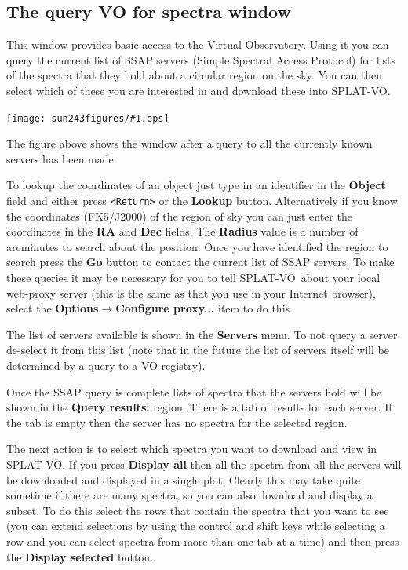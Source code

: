 \documentclass[twoside,11pt]{article}
\newcommand{\htmladdimg}[1]{}
\newcommand{\latexhtml}[2]{#1}
\newcommand{\xlabel}[1]{}
\renewcommand{\_}{\texttt{\symbol{95}}}
\newcommand{\SPLAT}{\textsf{SPLAT-VO}}
\newcommand{\mainfigure}[1]
{\begin{center}
 \latexhtml{\texttt{[image: sun243\_figures/\#1.eps]}}{\htmladdimg{#1.gif}}
 \end{center}
}
\newcommand{\submenuitem}[2]{\latexhtml{\textbf{#1$\rightarrow$#2}}{\textbf{#1->#2}}}
\newcommand{\labelitem}[1]{\textbf{#1}}
\newcommand{\hitext}[1]{\texttt{#1}}
\begin{document}
\newpage
\subsection{The query VO for spectra window{\xlabel{ssap_window}}}

This window provides basic access to the Virtual Observatory. Using it you can
query the current list of SSAP servers (Simple Spectral Access Protocol) for
lists of the spectra that they hold about a circular region on the sky. You
can then select which of these you are interested in and download these into
\SPLAT.

\mainfigure{ssapwindow}

The figure above shows the window after a query to all the currently known
servers has been made.

To lookup the coordinates of an object just type in an identifier in the
\labelitem{Object} field and either press \hitext{<Return>} or the
\labelitem{Lookup} button. Alternatively if you know the coordinates
(FK5/J2000) of the region of sky you can just enter the coordinates in the
\labelitem{RA} and \labelitem{Dec} fields. The \labelitem{Radius} value is a
number of arcminutes to search about the position. Once you have identified
the region to search press the \labelitem{Go} button to contact the current
list of SSAP servers. To make these queries it may be necessary for you to
tell \SPLAT\ about your local web-proxy server (this is the same as that you
use in your Internet browser), select the
\submenuitem{Options}{Configure proxy...} item to do this.

The list of servers available is shown in the \labelitem{Servers} menu. To not
query a server de-select it from this list (note that in the future the list
of servers itself will be determined by a query to a VO registry).

Once the SSAP query is complete lists of spectra that the servers hold will be
shown in the \labelitem{Query results:} region. There is a tab of results for
each server. If the tab is empty then the server has no spectra for the
selected region.

The next action is to select which spectra you want to download and view in
\SPLAT. If you press \labelitem{Display all} then all the spectra from all the
servers will be downloaded and displayed in a single plot. Clearly this may
take quite sometime if there are many spectra, so you can also download and
display a subset. To do this select the rows that contain the spectra that
you want to see (you can extend selections by using the control and shift keys
while selecting a row and you can select spectra from more than one tab at a
time) and then press the \labelitem{Display selected} button.
\end{document}
